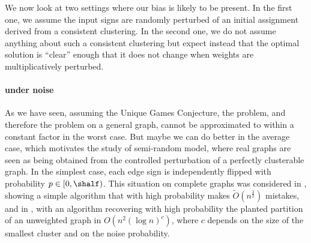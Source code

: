 We now look at two settings where our bias is likely to be present.  In the first one, we assume the
input signs are randomly perturbed of an initial assignment derived from a consistent clustering. In the second one, we do not
assume anything about such a consistent clustering but expect instead that the optimal solution is
\enquote{clear} enough that it does not change when weights are multiplicatively perturbed.

\paragraph{\pcc{} under noise}

As we have seen, assuming the Unique Games Conjecture, the \mmc{} problem, and therefore
the \pcc{} problem on a general graph, cannot be approximated to within a constant factor in the worst
case.  But maybe we can do better in the average case, which motivates the study of semi-random
model, where real graphs are seen as being obtained from the controlled perturbation of a perfectly
clusterable graph. In the simplest case, each edge sign is independently flipped with probability
$p \in [0, \shalf)$. This situation on complete graphs was considered in \autocite[Section
6]{Bansal2002}, showing a simple algorithm that with high probability makes
$\tilde{O}(n^\frac{3}{2})$ mistakes, and in \autocite[Theorem 2.6]{Ben-Dor99}, with an algorithm
recovering with high probability the planted partition of an unweighted graph in $O(n^2(\log n)^c)$,
where $c$ depends on the size of the smallest cluster and on the noise probability.

